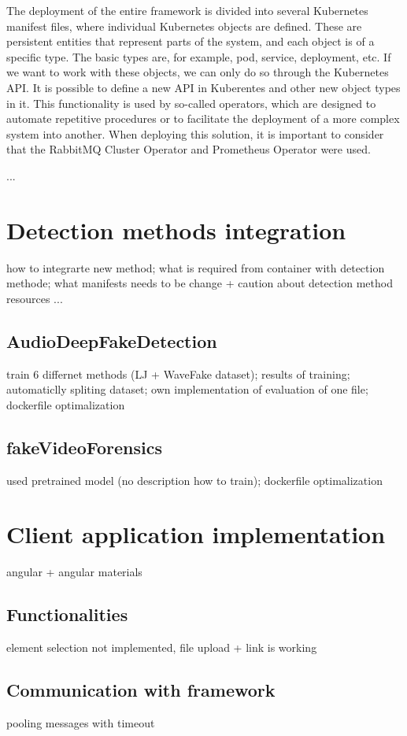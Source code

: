 The deployment of the entire framework is divided into several Kubernetes manifest files, where individual Kubernetes objects are defined. These are persistent entities that represent parts of the system, and each object is of a specific type. The basic types are, for example, pod, service, deployment, etc. If we want to work with these objects, we can only do so through the Kubernetes API. It is possible to define a new API in Kuberentes and other new object types in it. This functionality is used by so-called operators, which are designed to automate repetitive procedures or to facilitate the deployment of a more complex system into another. When deploying this solution, it is important to consider that the RabbitMQ Cluster Operator and Prometheus Operator were used.

...

\chapter{Detection methods integration}
how to integrarte new method; what is required from container with detection methode; what manifests needs to be change + caution about detection method resources
...
\section{AudioDeepFakeDetection}
train 6 differnet methods (LJ + WaveFake dataset); results of training; automaticlly spliting dataset; own implementation of evaluation of one file; dockerfile optimalization
\section{fakeVideoForensics}
used pretrained model (no description how to train); dockerfile optimalization

\chapter{Client application implementation}
angular + angular materials
\section{Functionalities}
element selection not implemented, file upload + link is working 
\section{Communication with framework}
pooling messages with timeout
